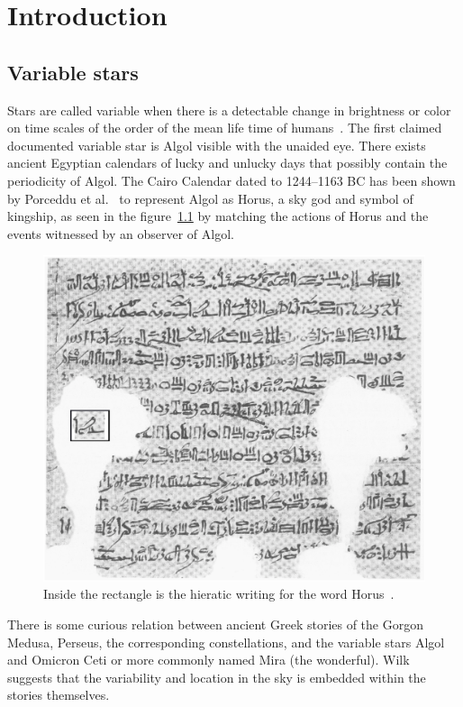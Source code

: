 \chapter{Introduction}\label{ch:intro}

\section{Variable stars}
Stars are called variable when there is a detectable change in brightness or color on time scales of the order
of the mean life time of humans~\cite{percy_2007, sterken_1996}.
The first claimed documented variable star is Algol visible with the unaided eye.
There exists ancient Egyptian calendars of lucky and unlucky days that possibly contain the periodicity of Algol\cite{porceddu_2008, porceddu_2018}.
The Cairo Calendar dated to 1244--1163 BC has been shown by Porceddu et al.~\cite{porceddu_2015} to represent Algol as Horus, a sky god and
symbol of kingship,
as seen in the figure~\ref{fig:horus} by matching the actions of Horus and the events witnessed by an observer of Algol.

\begin{figure}[h]
    \centering
    \includegraphics[width=\columnwidth]{figures/horus.eps}
    \caption{Inside the rectangle is the hieratic writing for the word Horus~\protect\cite{porceddu_2015}.}
\label{fig:horus}
\end{figure}

There is some curious relation between ancient Greek stories of the Gorgon Medusa, Perseus, the corresponding constellations, 
and the variable stars Algol and Omicron Ceti or more commonly named Mira (the wonderful).
Wilk~\cite{wilk_1996} suggests that the variability and location in the sky is embedded within the stories themselves.


